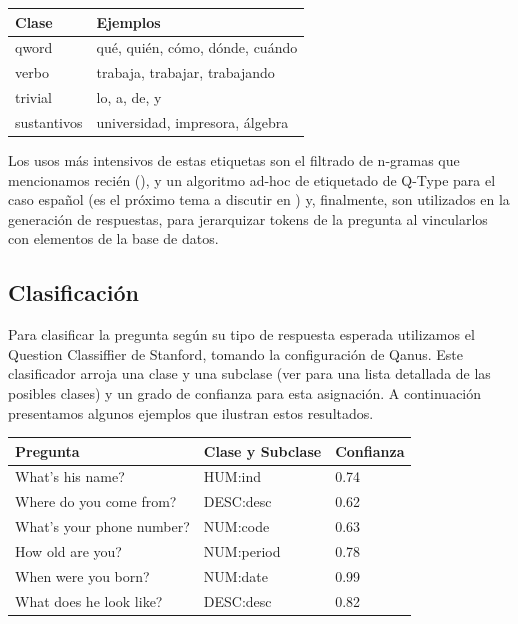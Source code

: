 \begin{center}
\begin{tabular}{| l | l |}
\hline
Clase & Ejemplos\\ \hline
qword  & qué, quién, cómo, dónde, cuándo\\ \hline
verbo & trabaja, trabajar, trabajando \\ \hline
trivial  & lo, a, de, y \\ \hline
sustantivos  & universidad, impresora, álgebra \\ \hline
\end{tabular}
\end{center}

Los usos más intensivos de estas etiquetas son el filtrado de n-gramas que mencionamos recién (), y un algoritmo ad-hoc de etiquetado de Q-Type para el caso español (es el próximo tema a discutir en ) y, finalmente, son utilizados en la generación de respuestas, para jerarquizar  tokens de la pregunta al vincularlos con elementos de la base de datos.

\subsection{Clasificación}
\label{subsec:qtype}
Para clasificar la pregunta según su tipo de respuesta esperada utilizamos el Question Classiffier de Stanford, tomando la configuración de Qanus. Este clasificador arroja una clase y una subclase (ver  para una lista detallada de las posibles clases) y un grado de confianza para esta asignación. A continuación presentamos algunos ejemplos que ilustran estos resultados.

\begin{center}
\begin{tabular}{| l | l | l |}
\hline
Pregunta & Clase y Subclase & Confianza\\ \hline 
What's his name? & HUM:ind & 0.74 \\ \hline 
Where do you come from? & DESC:desc & 0.62 \\ \hline 
What's your phone number? & NUM:code & 0.63 \\ \hline 
How old are you? & NUM:period & 0.78 \\ \hline 
When were you born? & NUM:date & 0.99 \\ \hline 
What does he look like? & DESC:desc & 0.82 \\ \hline 
\end{tabular}
\end{center}

